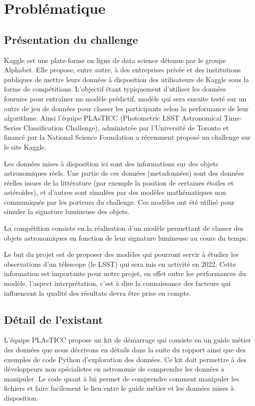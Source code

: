 \chapter{Problématique}

\section{Présentation du challenge}

Kaggle est une plate-forme en ligne de data science détenue par le groupe Alphabet. Elle propose, entre autre, à des entreprises privée et des institutions publiques de mettre leurs données à disposition des utilisateurs de Kaggle sous la forme de compétitions. L'objectif étant typiquement d'utiliser les données fournies pour entraîner un modèle prédictif, modèle qui sera ensuite testé sur un autre de jeu de données pour classer les participants selon la performance de leur algorithme. Ainsi l'équipe PLAsTICC (Photometric LSST Astronomical Time-Series Classification Challenge), administrée par l'Université de Toronto et financé par la National Science Foundation a récemment proposé un challenge sur le site Kaggle. 

Les données mises à disposition ici sont des informations sur des objets astronomiques réels. Une partie de ces données (metadonnées) sont des données réelles issues de la littérature (par exemple la position de certaines étoiles et astéroïdes), et d'autres sont simulées par des modèles mathématiques non communiqués par les porteurs du challenge. Ces modèles ont été utilisé pour simuler la signature lumineuse des objets. 

La compétition consiste en la réalisation d'un modèle permettant de classer des objets astronomiques en fonction de leur signature lumineuse au cours du temps. 

Le but du projet est de proposer des modèles qui pourront servir à étudier les observations d'un télescope (le LSST) qui sera mis en activité en 2022. Cette information est importante pour notre projet, en effet outre les performances du modèle, l'aspect interprétation, c'est à dire la connaissance des facteurs qui influencent la qualité des résultats devra être prise en compte. 



\section{Détail de l’existant}

L'équipe PLAsTICC propose un kit de démarrage qui consiste en un guide métier des données que nous décrivons en détails dans la suite du rapport ainsi que des exemples de code Python d'exploration des données. Ce kit doit permettre à des développeurs non spécialistes en astronomie de comprendre les données a manipuler. Le code quant à lui permet de comprendre comment manipuler les fichiers et faire facilement le lien entre le guide métier et les données mises à disposition.


